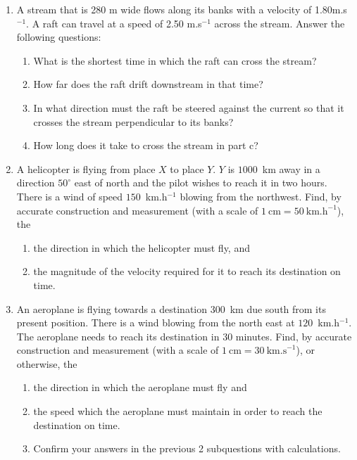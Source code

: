 \begin{eocexercises}{}
\begin{enumerate}
\item A stream that is 280 m wide flows along its banks with a velocity of 1.80m.s$^{-1}$. A raft can travel at a speed of 2.50 m.s$^{-1}$ across the stream. Answer the following questions:
\begin{enumerate}
\item What is the shortest time in which the raft can cross the stream?
\item How far does the raft drift downstream in that time?
\item In what direction must the raft be steered against the current so that it crosses the stream perpendicular to its banks?
\item How long does it take to cross the stream in part c?
\end{enumerate}

\item{A helicopter is flying from place $X$ to place $Y$. $Y$ is $1000$~km away in a direction $50^{\circ}$ east of north and the pilot wishes to reach it in two hours. There is a wind of speed $150$~km.h$^{-1}$ blowing from the northwest. Find, by accurate construction and measurement (with a scale of $1~\mathrm{cm} = 50~\mathrm{km.h}^{-1}$), the
\begin{enumerate}
\item the direction in which the helicopter must fly, and
\item the magnitude of the velocity required for it to reach its destination on time.
\end{enumerate}
}

\item{An aeroplane is flying towards a destination $300$~km due south from its present position. There is a wind blowing from the north east at $120$~km.h$^{-1}$. The aeroplane needs to reach its destination in $30$ minutes. Find, by accurate construction and measurement (with a scale of $1~ \mathrm{cm} = 30~ \mathrm{km.s}^{-1}$), or otherwise, the
\begin{enumerate}
\item the direction in which the aeroplane must fly and
\item the speed which the aeroplane must maintain in order to reach the destination on time.
\item Confirm your answers in the previous 2 subquestions with calculations.
\end{enumerate}
}


\end{enumerate}
\end{eocexercises}
